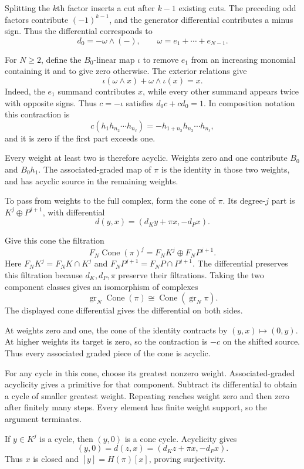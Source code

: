 Splitting the $k$th factor inserts a cut after $k-1$ existing cuts.
The preceding odd factors contribute $(-1)^{k-1}$, and the generator
differential contributes a minus sign.
Thus the differential corresponds to
\[
 d_0=-\omega\wedge(-),\qquad\omega=e_1+\cdots+e_{N-1}.
\]

For $N\geq2$, define the $B_0$-linear map $\iota$ to remove $e_1$
from an increasing monomial containing it and to give zero otherwise.
The exterior relations give
\[
 \iota(\omega\wedge x)+\omega\wedge\iota(x)=x.
\]
Indeed, the $e_1$ summand contributes $x$, while every other
summand appears twice with opposite signs. Thus $c=-\iota$ satisfies
$d_0c+cd_0=1$. In composition notation this contraction is
\[
 c(h_1h_{n_2}\cdots h_{n_\ell})
 =-h_{1+n_2}h_{n_3}\cdots h_{n_\ell},
\]
and it is zero if the first part exceeds one.

Every weight at least two is therefore acyclic.
Weights zero and one contribute $B_0$ and $B_0h_1$.
The associated-graded map of $\pi$ is the identity in those two
weights, and has acyclic source in the remaining weights.

To pass from weights to the full complex, form the cone of $\pi$.
Its degree-$j$ part is $K^j\oplus P^{j+1}$, with differential
\[
 d(y,x)=(d_Ky+\pi x,-d_Px).
\]

Give this cone the filtration
\[
 F_N\operatorname{Cone}(\pi)^j=F_NK^j\oplus F_NP^{j+1}.
\]
Here $F_NK^j=F_NK\cap K^j$ and $F_NP^{j+1}=F_NP\cap P^{j+1}$.
The differential preserves this filtration because $d_K,d_P,\pi$
preserve their filtrations. Taking the two component classes gives
an isomorphism of complexes
\[
 \operatorname{gr}_N\operatorname{Cone}(\pi)
 \cong\operatorname{Cone}(\operatorname{gr}_N\pi).
\]
The displayed cone differential gives the differential on both sides.

At weights zero and one, the cone of the identity contracts by
$(y,x)\mapsto(0,y)$.
At higher weights its target is zero, so the contraction is $-c$
on the shifted source.
Thus every associated graded piece of the cone is acyclic.

For any cycle in this cone, choose its greatest nonzero weight.
Associated-graded acyclicity gives a primitive for that component.
Subtract its differential to obtain a cycle of smaller greatest weight.
Repeating reaches weight zero and then zero after finitely many steps.
Every element has finite weight support, so the argument terminates.

If $y\in K^j$ is a cycle, then $(y,0)$ is a cone cycle.
Acyclicity gives
\[
 (y,0)=d(z,x)=(d_Kz+\pi x,-d_Px).
\]
Thus $x$ is closed and $[y]=H(\pi)[x]$, proving surjectivity.

